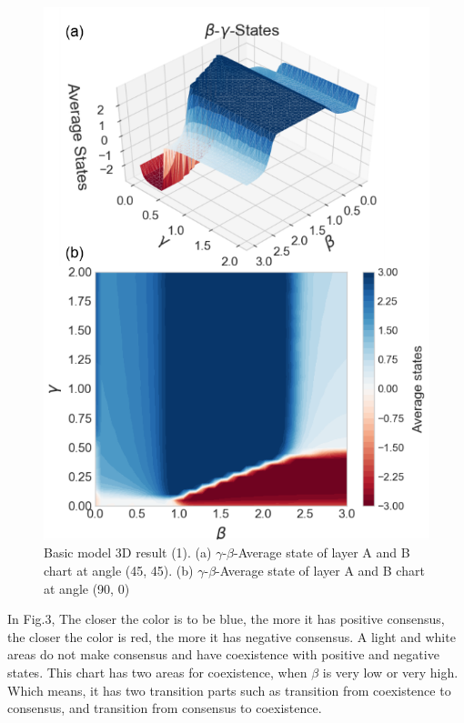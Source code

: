 \documentclass[english]{cccconf}
\begin{document}
\begin{figure}[!htb]
  \centering
  \includegraphics[width=\hsize]{FIG3.png}
  \caption{Basic model 3D result (1). (a) $\gamma$-$\beta$-Average state of layer A and B chart at angle (45, 45). (b) $\gamma$-$\beta$-Average state of layer A and B chart at angle (90, 0)}
  \label{Fig3}
\end{figure}
In Fig.3, The closer the color is to be blue, the more it has positive consensus, the closer the color is red, the more it has negative consensus. A light and white areas do not make consensus and have coexistence with positive and negative states. This chart has two areas for coexistence, when $\beta$ is very low or very high. Which means, it has two transition parts such as transition from coexistence to consensus, and transition from consensus to coexistence.
\end{document}
